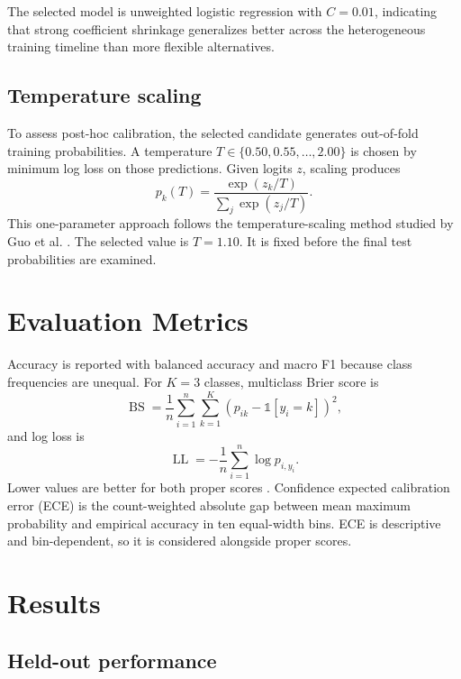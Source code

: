 \documentclass[10pt]{article}
\begin{document}
The selected model is unweighted logistic regression with $C=0.01$, indicating
that strong coefficient shrinkage generalizes better across the heterogeneous
training timeline than more flexible alternatives.

\subsection{Temperature scaling}

To assess post-hoc calibration, the selected candidate generates out-of-fold
training probabilities. A temperature $T\in\{0.50,0.55,\ldots,2.00\}$ is chosen
by minimum log loss on those predictions. Given logits $z$, scaling produces
\begin{equation}
p_k(T) = \frac{\exp(z_k/T)}{\sum_j \exp(z_j/T)}.
\end{equation}
This one-parameter approach follows the temperature-scaling method studied by
Guo et al. \cite{guo2017}. The selected value is $T=1.10$. It is fixed before
the final test probabilities are examined.

\section{Evaluation Metrics}

Accuracy is reported with balanced accuracy and macro F1 because class frequencies
are unequal. For $K=3$ classes, multiclass Brier score is
\begin{equation}
\operatorname{BS} = \frac{1}{n}\sum_{i=1}^{n}\sum_{k=1}^{K}
(p_{ik}-\mathbb{1}[y_i=k])^2,
\end{equation}
and log loss is
\begin{equation}
\operatorname{LL} = -\frac{1}{n}\sum_{i=1}^{n}\log p_{i,y_i}.
\end{equation}
Lower values are better for both proper scores \cite{brier1950,gneiting2007}.
Confidence expected calibration error (ECE) is the count-weighted absolute gap
between mean maximum probability and empirical accuracy in ten equal-width bins.
ECE is descriptive and bin-dependent, so it is considered alongside proper scores.

\section{Results}

\subsection{Held-out performance}
\end{document}
